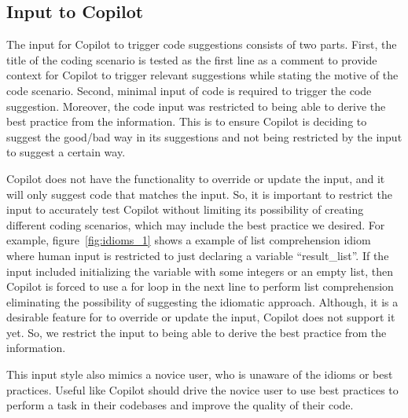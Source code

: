 \subsection{Input to Copilot}
\label{input}
The input for Copilot to trigger code suggestions consists of two parts.
First, the title of the coding scenario is tested as the first line as a comment to provide context for Copilot to trigger relevant suggestions while stating the motive of the code scenario. 
Second, minimal input of code is required to trigger the code suggestion. Moreover, the code input was restricted to being able to derive the best practice from the information. 
This is to ensure Copilot is deciding to suggest the good/bad way in its suggestions and not being restricted by the input to suggest a certain way. 

Copilot does not have the functionality to override or update the input, and it will only suggest code that matches the input. So, it is important to restrict the input to accurately test Copilot without limiting its possibility of creating different coding scenarios, which may include the best practice we desired. 
For example, figure~\ref{fig:idioms_1} shows a example of list comprehension idiom where human input is restricted to just declaring a variable ``result\_list''. If the input included initializing the variable with some integers or an empty list, 
then Copilot is forced to use a for loop in the next line to perform list comprehension eliminating the possibility of suggesting the idiomatic approach. 
Although, it is a desirable feature for \cct{} to override or update the input, Copilot does not support it yet. So, we restrict the input to being able to derive the best practice from the information. 

This input style also mimics a novice user, who is unaware of the idioms or best practices. 
Useful \cct{} like Copilot should drive the novice user to use best practices to perform a task in their codebases and improve the quality of their code.